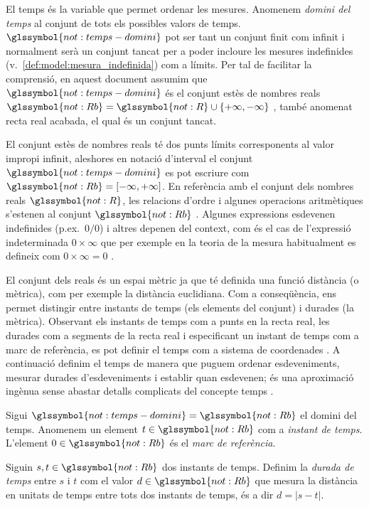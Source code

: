 El temps és la variable que permet ordenar les mesures.  Anomenem
\emph{domini del temps} al conjunt  de
tots els possibles valors de temps. $\glssymbol{not:temps-domini}$ pot
ser tant un conjunt finit com infinit i normalment serà un conjunt
tancat %
per a poder incloure les mesures indefinides (v.\
\autoref{def:model:mesura_indefinida}) com a límits.  Per tal de
facilitar la comprensió, en aquest document assumim que
$\glssymbol{not:temps-domini}$ és el conjunt estès de nombres reals
$\glssymbol{not:Rb} = \glssymbol{not:R} \cup
\{+\infty,-\infty\}$ \parencite{wiki:extendedreal,cantrell:extendedreal},
també anomenat recta real acabada, el qual és un conjunt tancat.


El conjunt estès de nombres reals té dos punts límits corresponents al
valor impropi infinit, aleshores en notació d'interval el conjunt
$\glssymbol{not:temps-domini}$ es pot escriure com $\glssymbol{not:Rb}
= [-\infty,+\infty]$. En referència amb el conjunt dels nombres reals
$\glssymbol{not:R}$, les relacions d'ordre i algunes operacions
aritmètiques s'estenen al conjunt $\glssymbol{not:Rb}$
\parencite{cantrell:extendedreal}.  Algunes expressions esdevenen
indefinides (p.ex.\ $0/0$) i altres depenen del context, com és el cas
de l'expressió indeterminada $0 \times \infty$ que per exemple en la
teoria de la mesura habitualment es defineix com $0 \times \infty =
0$ \parencite{wiki:extendedreal}.


El conjunt dels reals és un espai mètric ja que té definida una funció
distància (o mètrica), com per exemple la distància euclidiana. Com a
conseqüència, ens permet distingir entre instants de temps (els
elements del conjunt) i durades (la mètrica). Observant els instants
de temps com a punts en la recta real, les durades com a segments de
la recta real i especificant un instant de temps com a marc de
referència, es pot definir el temps com a sistema de
coordenades \parencite{iep:time-supplement,kopetz11:realtime}. A
continuació definim el temps de manera que puguem ordenar
esdeveniments, mesurar durades d'esdeveniments i establir quan
esdevenen; és una aproximació ingènua sense abastar detalls complicats
del concepte temps \parencite{iep:time}.


\begin{definition}[Temps]
  \label{def:model:temps}
  Sigui $\glssymbol{not:temps-domini}=\glssymbol{not:Rb}$ el domini del temps.
  Anomenem un element $t\in\glssymbol{not:Rb}$ com a \emph{instant de temps}.
  L'element $0\in\glssymbol{not:Rb}$ és el \emph{marc de referència}.

  Siguin $s,t\in\glssymbol{not:Rb}$ dos instants de temps.  Definim la
  \emph{durada de temps} entre $s$ i $t$ com el valor $d \in\glssymbol{not:Rb}$
  que mesura la distància en unitats de temps entre tots dos instants
  de temps, és a dir $d= |s-t|$.


\end{definition}

